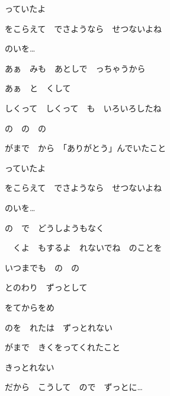 \documentclass[14pt]{ltjsarticle}
\begin{document}
{  っていたよ
  \jisho{}

  をこらえて　でさようなら　せつないよね
  \jisho{}

  のいを…
  \jisho{}

\item
  あぁ　みも　あとしで　っちゃうから
  \jisho{}

  あぁ　と　くして
  \jisho{}

\item
  しくって　しくって　も　いろいろしたね
  \jisho{}

  の　の　の
  \jisho{}

\item
  がまで　から　「ありがとう」んでいたこと
  \jisho{}

  っていたよ
  \jisho{}

  をこらえて　でさようなら　せつないよね
  \jisho{}

  のいを…
  \jisho{}

\item
  の　で　どうしようもなく
  \jisho{}

  　くよ　もするよ　れないでね　のことを
  \jisho{}

  いつまでも　の　の
  \jisho{}

\item
  とのわり　ずっとして
  \jisho{}

  をてからをめ
  \jisho{}

  のを　れたは　ずっとれない
  \jisho{}

  がまで　きくをってくれたこと
  \jisho{}

  きっとれない
  \jisho{}

  だから　こうして　ので　ずっとに…
  \jisho{}

}
\end{document}
